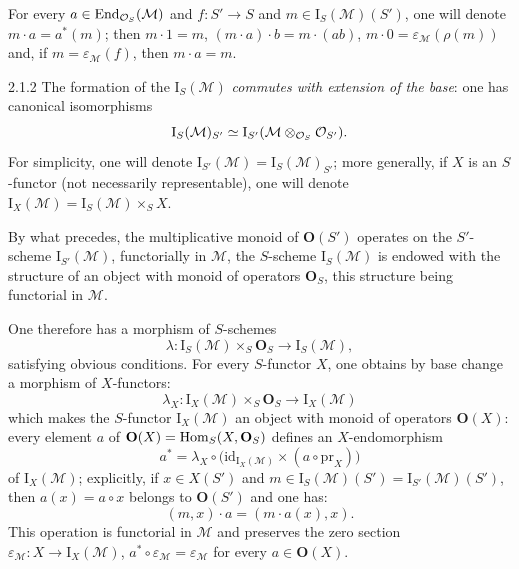 For every \(a\in\operatorname{End}_{\mathcal{O}_S}(\mathcal{M})\) and \(f\colon S'\to S\) and
\(m\in\mathrm{I}_S(\mathcal{M})(S')\), one will denote
\(m\cdot a=a^*(m)\); then \(m\cdot 1=m\),
\((m\cdot a)\cdot b=m\cdot(ab)\),
\(m\cdot 0=\varepsilon_{\mathcal{M}}(\rho(m))\) and, if
\(m=\varepsilon_{\mathcal{M}}(f)\), then \(m\cdot a=m\).%
{\renewcommand{\thefootnote}{(9)}}

\begin{remark}{2.1.2}
\label{II.2.1.2}
The formation of the \(\mathrm{I}_S(\mathcal{M})\) \emph{commutes with
extension of the base}: one has canonical isomorphisms
\[
\mathrm{I}_S(\mathcal{M})_{S'}
\simeq
\mathrm{I}_{S'}(\mathcal{M}\otimes_{\mathcal{O}_S}\mathcal{O}_{S'}).
\]
For simplicity, one will denote
\(\mathrm{I}_{S'}(\mathcal{M})=\mathrm{I}_S(\mathcal{M})_{S'}\); more
generally, if \(X\) is an \(S\)-functor (not necessarily representable), one
will denote \(\mathrm{I}_X(\mathcal{M})=\mathrm{I}_S(\mathcal{M})\times_S X\).
\end{remark}

\label{II.2.1.3}
{\renewcommand{\thefootnote}{(10)}}%
By what precedes, the multiplicative monoid of \(\mathbf{O}(S')\) operates on
the \(S'\)-scheme \(\mathrm{I}_{S'}(\mathcal{M})\), functorially in
\(\mathcal{M}\), \ie the \(S\)-scheme \(\mathrm{I}_S(\mathcal{M})\) is endowed
with the structure of an object with monoid of operators \(\mathbf{O}_S\),
this structure being functorial in \(\mathcal{M}\).

One therefore has a morphism of \(S\)-schemes
\[
\lambda\colon\mathrm{I}_S(\mathcal{M})\times_S\mathbf{O}_S
\longrightarrow\mathrm{I}_S(\mathcal{M}),
\]
satisfying obvious conditions. For every \(S\)-functor \(X\), one obtains by
base change a morphism of \(X\)-functors:
\[
\lambda_X\colon\mathrm{I}_X(\mathcal{M})\times_S\mathbf{O}_S
\longrightarrow\mathrm{I}_X(\mathcal{M})
\]
which makes the \(S\)-functor \(\mathrm{I}_X(\mathcal{M})\) an object with
monoid of operators \(\mathbf{O}(X)\): every element \(a\) of
\(\mathbf{O}(X)=\operatorname{Hom}_S(X,\mathbf{O}_S)\) defines an \(X\)-endomorphism
\[
a^*=\lambda_X\circ\bigl(\mathrm{id}_{\mathrm{I}_X(\mathcal{M})}
\times(a\circ\mathrm{pr}_X)\bigr)
\]
of \(\mathrm{I}_X(\mathcal{M})\); explicitly, if \(x\in X(S')\) and
\(m\in\mathrm{I}_S(\mathcal{M})(S')=\mathrm{I}_{S'}(\mathcal{M})(S')\), then
\(a(x)=a\circ x\) belongs to \(\mathbf{O}(S')\) and one has:
\[
(m,x)\cdot a=(m\cdot a(x),x).
\]
This operation is functorial in \(\mathcal{M}\) and preserves the zero
section \(\varepsilon_{\mathcal{M}}\colon X\to\mathrm{I}_X(\mathcal{M})\),
\ie \(a^*\circ\varepsilon_{\mathcal{M}}=\varepsilon_{\mathcal{M}}\) for every
\(a\in\mathbf{O}(X)\).

